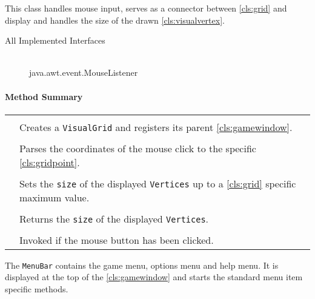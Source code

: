 This class handles mouse input, serves as a connector between \ref{cls:grid} and display and handles the size of the drawn \ref{cls:visualvertex}. \\ 
\begin{description}
	\item[All Implemented Interfaces] \hfill \\
	java.awt.event.MouseListener
\end{description}
\centerdash

\paragraph*{Method Summary}
\paragraph*{}
\begin{longtable}{Lp{10cm}}
	\startmethodtable
	 \\
	& Creates a \texttt{VisualGrid} and registers its parent \ref{cls:gamewindow}. \\
	 \\
	& Parses the coordinates of the mouse click to the specific \ref{cls:gridpoint}. \\
	 \\
	& Sets the \texttt{size} of the displayed \texttt{Vertices} up to a \ref{cls:grid} specific maximum value. \\
	 \\
	& Returns the \texttt{size} of the displayed \texttt{Vertices}. \\ 
	 \\
	& Invoked if the mouse button has been clicked. \\ 
	\hline
\end{longtable}
\pagebreak


The \texttt{MenuBar} contains the game menu, options menu and help menu. It is displayed at the top of the \ref{cls:gamewindow} and starts the standard menu item specific methods. \\

